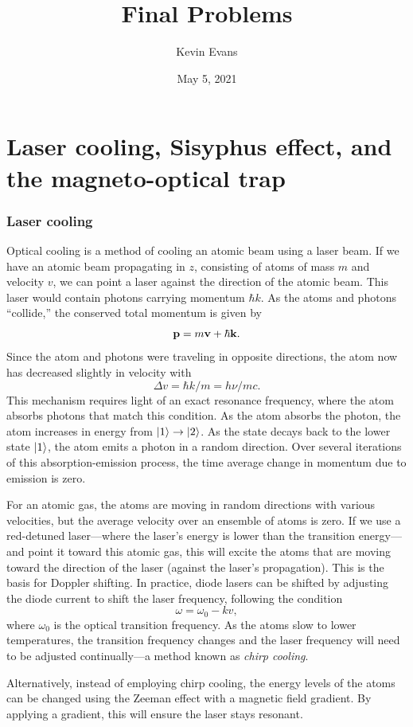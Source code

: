 \documentclass{homework}
\title{Final Problems}
\author{Kevin Evans}
\date{May 5, 2021}
\begin{document}
	\maketitle
	\section{Laser cooling, Sisyphus effect, and the magneto-optical trap}
	\subsubsection*{Laser cooling}
	Optical cooling is a method of cooling an atomic beam using a laser beam. If we have an atomic beam propagating in $z$, consisting of atoms of mass $m$ and velocity $v$, we can point a laser against the direction of the atomic beam. This laser would contain photons carrying momentum $\hbar k$. As the atoms and photons ``collide,'' the conserved total momentum is given by $$\boldsymbol{\mathrm{p}} = m \boldsymbol{\mathrm{v}} + \hbar \boldsymbol{\mathrm{k}}.$$
	Since the atom and photons were traveling in opposite directions, the atom now has decreased slightly in velocity with
	$$\Delta v = \hbar k / m = h \nu / m c.$$
	This mechanism requires light of an exact resonance frequency, where the atom absorbs photons that match this condition. As the atom absorbs the photon, the atom increases in energy from $\ket{1} \to \ket{2}$. As the state decays back to the lower state $\ket{1}$, the atom emits a photon in a random direction. Over several iterations of this absorption-emission process, the time average change in momentum due to emission is zero.
	
	For an atomic gas, the atoms are moving in random directions with various velocities, but the average velocity over an ensemble of atoms is zero. If we use a red-detuned laser---where the laser's energy is lower than the transition energy---and point it toward this atomic gas, this will excite the atoms that are moving toward the direction of the laser (against the laser's propagation). This is the basis for Doppler shifting. In practice, diode lasers can be shifted by adjusting the diode current to shift the laser frequency, following the condition
	$$\omega = \omega_0 - k v,$$
	where $\omega_0$ is the optical transition frequency. As the atoms slow to lower temperatures, the transition frequency changes and the laser frequency will need to be adjusted continually---a method known as \textit{chirp cooling}. 
	
	Alternatively, instead of employing chirp cooling, the energy levels of the atoms can be changed using the Zeeman effect with a magnetic field gradient. By applying a gradient, this will ensure the laser stays resonant.
	
\end{document}
